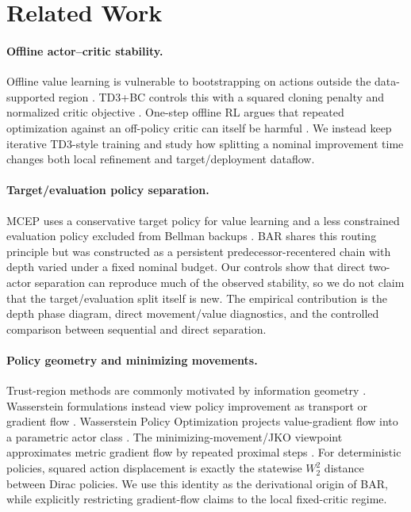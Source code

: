 \documentclass[twoside]{article}
\begin{document}
\section{Related Work}
\paragraph{Offline actor--critic stability.}
Offline value learning is vulnerable to bootstrapping on actions outside the data-supported region \citep{fujimoto2019offpolicy,kumar2019bear}. TD3+BC controls this with a squared cloning penalty and normalized critic objective \citep{fujimoto2021minimalist}. One-step offline RL argues that repeated optimization against an off-policy critic can itself be harmful \citep{brandfonbrener2021offline}. We instead keep iterative TD3-style training and study how splitting a nominal improvement time changes both local refinement and target/deployment dataflow.

\paragraph{Target/evaluation policy separation.}
MCEP uses a conservative target policy for value learning and a less constrained evaluation policy excluded from Bellman backups \citep{xu2024mcep}. BAR shares this routing principle but was constructed as a persistent predecessor-recentered chain with depth varied under a fixed nominal budget. Our controls show that direct two-actor separation can reproduce much of the observed stability, so we do not claim that the target/evaluation split itself is new. The empirical contribution is the depth phase diagram, direct movement/value diagnostics, and the controlled comparison between sequential and direct separation.

\paragraph{Policy geometry and minimizing movements.}
Trust-region methods are commonly motivated by information geometry \citep{amari2000methods,schulman2015trust}. Wasserstein formulations instead view policy improvement as transport or gradient flow \citep{zhang2018policy,moskovitz2020efficient,terpin2022trust,song2023metric}. Wasserstein Policy Optimization projects value-gradient flow into a parametric actor class \citep{pfau2025wpo}. The minimizing-movement/JKO viewpoint approximates metric gradient flow by repeated proximal steps \citep{ambrosio2005gradient,otto2001geometry}. For deterministic policies, squared action displacement is exactly the statewise $W_2^2$ distance between Dirac policies. We use this identity as the derivational origin of BAR, while explicitly restricting gradient-flow claims to the local fixed-critic regime.
\end{document}
